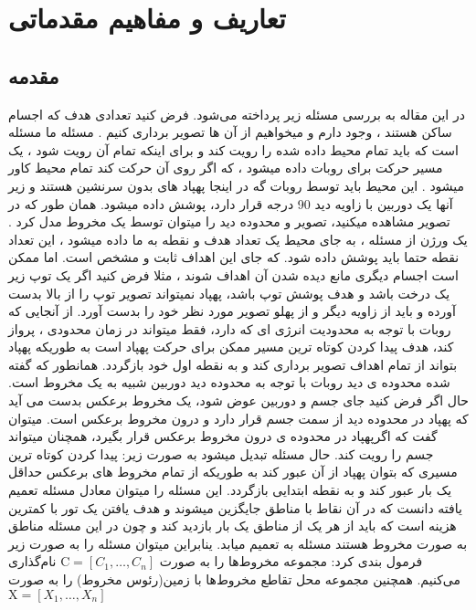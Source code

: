 \documentclass[12pt]{book}
\begin{document}
\chapter{تعاریف و مفاهیم مقدماتی}\label{chp1}
\section{مقدمه}



در این مقاله به بررسی مسئله زیر پرداخته می‌شود.
فرض کنید تعدادی هدف که اجسام ساکن هستند ، وجود دارم و میخواهیم از آن ها تصویر برداری کنیم . مسئله ما مسئله
 است که باید تمام محیط داده شده را رویت کند و برای اینکه تمام آن رویت شود ، یک مسیر حرکت برای روبات داده میشود ، که اگر روی آن حرکت کند تمام محیط کاور میشود . این محیط باید توسط روبات گه در اینجا پهپاد های بدون سرنشین هستند و زیر آنها یک دوربین با زاویه دید 90 درجه قرار دارد، پوشش داده میشود. همان طور که در تصویر مشاهده میکنید، تصویر و محدوده دید را میتوان توسط یک مخروط مدل کرد . یک ورژن از مسئله
، به جای محیط یک تعداد هدف و نقطه به ما داده میشود ، این تعداد نقطه حتما باید پوشش داده شود. که جای این اهداف ثابت و مشخص است.
اما ممکن است اجسام دیگری مانع دیده شدن آن اهداف شوند ، مثلا فرض کنید اگر یک توپ زیر یک درخت باشد و هدف پوشش توپ باشد، پهپاد نمیتواند تصویر توپ را از بالا بدست آورده و باید از زاویه دیگر و از پهلو تصویر مورد نظر خود را بدست آورد. 
از آنجایی که روبات با توجه به محدودیت انرژی ای که دارد، فقط میتواند در زمان محدودی ، پرواز کند، هدف پیدا کردن کوتاه ترین مسیر ممکن برای حرکت پهپاد است به طوریکه پهپاد بتواند از تمام اهداف تصویر برداری کند و به نقطه اول خود بازگردد.
همانطور که گفته شده محدوده ی دید روبات با توجه به محدوده دید دوربین شبیه به یک مخروط است. حال اگر فرض کنید جای جسم و دوربین عوض شود، یک مخروط برعکس بدست می آید که پهپاد در محدوده دید از سمت جسم قرار دارد و درون مخروط برعکس است. میتوان گفت که اگرپهپاد در محدوده ی درون مخروط برعکس قرار بگیرد، همچنان میتواند جسم را رویت کند.
حال مسئله تبدیل میشود به صورت زیر:
پیدا کردن کوتاه ترین مسیری که بتوان پهپاد از آن عبور کند به طوریکه از تمام مخروط های برعکس حداقل یک بار عبور کند و به نقطه ابتدایی بازگردد. این مسئله را میتوان معادل مسئله تعمیم یافته
 دانست که در آن نقاط با مناطق جایگزین میشوند و هدف یافتن یک تور با کمترین هزینه است که باید از هر یک از مناطق یک بار بازدید کند و چون در این مسئله مناطق به صورت مخروط هستند مسئله به
تعمیم میابد.
ینابراین میتوان مسئله را به صورت زیر فرمول بندی کرد:
مجموعه مخروط‌‌‌ها را به صورت $\mathrm{C}=\left[C_{1}, \ldots, C_{n}\right]$
نام‌گذاری می‌کنیم. همچنین مجموعه محل تقاطع مخروط‌‌‌ها با زمین(رئوس مخروط) را به صورت $\mathrm{X}=\left[X_{1}, \ldots, X_{n}\right]$
\end{document}
